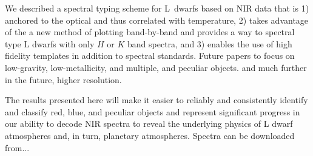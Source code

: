 \documentclass[12pt,preprint]{aastex}
\begin{document}
We described a spectral typing scheme for L~dwarfs based on NIR data that is 1) anchored to the optical and thus correlated with temperature, 2) takes advantage of the a new method of plotting band-by-band and provides a way to spectral type L dwarfs with only $H$ or $K$ band spectra, and 3) enables the use of high fidelity templates in addition to spectral standards.
Future papers to focus on low-gravity, low-metallicity, and multiple, and peculiar objects. and much further in the future, higher resolution.

The results presented here will make it easier to reliably and consistently identify and classify red, blue, and peculiar objects and represent significant progress in our ability to decode NIR spectra to reveal the underlying physics of L dwarf atmospheres and, in turn, planetary atmospheres.
Spectra can be downloaded from...
\end{document}
